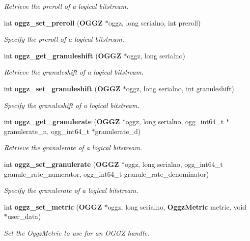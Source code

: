 \begin{DoxyCompactItemize}
\begin{DoxyCompactList}\small\item\em \-Retrieve the preroll of a logical bitstream. \end{DoxyCompactList}\item 
int {\bf oggz\-\_\-set\-\_\-preroll} ({\bf \-O\-G\-G\-Z} $\ast$oggz, long serialno, int preroll)
\begin{DoxyCompactList}\small\item\em \-Specify the preroll of a logical bitstream. \end{DoxyCompactList}\item 
int {\bf oggz\-\_\-get\-\_\-granuleshift} ({\bf \-O\-G\-G\-Z} $\ast$oggz, long serialno)
\begin{DoxyCompactList}\small\item\em \-Retrieve the granuleshift of a logical bitstream. \end{DoxyCompactList}\item 
int {\bf oggz\-\_\-set\-\_\-granuleshift} ({\bf \-O\-G\-G\-Z} $\ast$oggz, long serialno, int granuleshift)
\begin{DoxyCompactList}\small\item\em \-Specify the granuleshift of a logical bitstream. \end{DoxyCompactList}\item 
int {\bf oggz\-\_\-get\-\_\-granulerate} ({\bf \-O\-G\-G\-Z} $\ast$oggz, long serialno, ogg\-\_\-int64\-\_\-t $\ast$granulerate\-\_\-n, ogg\-\_\-int64\-\_\-t $\ast$granulerate\-\_\-d)
\begin{DoxyCompactList}\small\item\em \-Retrieve the granulerate of a logical bitstream. \end{DoxyCompactList}\item 
int {\bf oggz\-\_\-set\-\_\-granulerate} ({\bf \-O\-G\-G\-Z} $\ast$oggz, long serialno, ogg\-\_\-int64\-\_\-t granule\-\_\-rate\-\_\-numerator, ogg\-\_\-int64\-\_\-t granule\-\_\-rate\-\_\-denominator)
\begin{DoxyCompactList}\small\item\em \-Specify the granulerate of a logical bitstream. \end{DoxyCompactList}\item 
int {\bf oggz\-\_\-set\-\_\-metric} ({\bf \-O\-G\-G\-Z} $\ast$oggz, long serialno, {\bf \-Oggz\-Metric} metric, void $\ast$user\-\_\-data)
\begin{DoxyCompactList}\small\item\em \-Set the \-Oggz\-Metric to use for an \-O\-G\-G\-Z handle. \end{DoxyCompactList}\item 

\end{DoxyCompactItemize}
